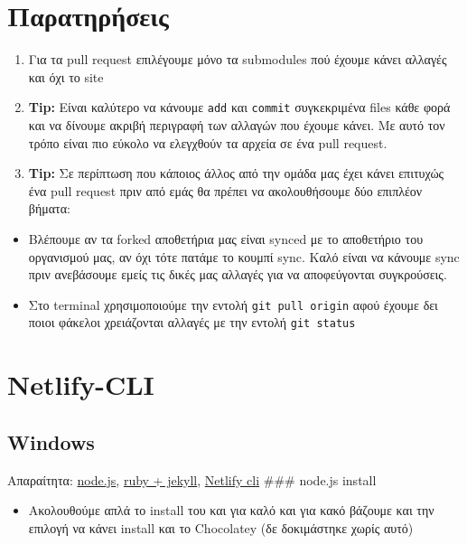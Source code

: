 \documentclass[
]{article}
\begin{document}
\hypertarget{ux3c0ux3b1ux3c1ux3b1ux3c4ux3b7ux3c1ux3aeux3c3ux3b5ux3b9ux3c2}{%
\section{Παρατηρήσεις}\label{ux3c0ux3b1ux3c1ux3b1ux3c4ux3b7ux3c1ux3aeux3c3ux3b5ux3b9ux3c2}}

\begin{enumerate}
\item
  Για τα pull request επιλέγουμε μόνο τα submodules πού έχουμε κάνει
  αλλαγές και όχι το site
\item
  \textbf{Tip:} Είναι καλύτερο να κάνουμε \texttt{add} και
  \texttt{commit} συγκεκριμένα files κάθε φορά και να δίνουμε ακριβή
  περιγραφή των αλλαγών που έχουμε κάνει. Με αυτό τον τρόπο είναι πιο
  εύκολο να ελεγχθούν τα αρχεία σε ένα pull request.
\item
  \textbf{Tip:} Σε περίπτωση που κάποιος άλλος από την ομάδα μας έχει
  κάνει επιτυχώς ένα pull request πριν από εμάς θα πρέπει να
  ακολουθήσουμε δύο επιπλέον βήματα:
\end{enumerate}

\begin{itemize}
\item
  Βλέπουμε αν τα forked αποθετήρια μας είναι synced με το αποθετήριο του
  οργανισμού μας, αν όχι τότε πατάμε το κουμπί sync. Καλό είναι να
  κάνουμε sync πριν ανεβάσουμε εμείς τις δικές μας αλλαγές για να
  αποφεύγονται συγκρούσεις.
\item
  Στο terminal χρησιμοποιούμε την εντολή \texttt{git~pull~origin} αφού
  έχουμε δει ποιοι φάκελοι χρειάζονται αλλαγές με την εντολή
  \texttt{git~status}
\end{itemize}

\hypertarget{netlify-cli}{%
\section{Netlify-CLI}\label{netlify-cli}}

\hypertarget{windows}{%
\subsection{Windows}\label{windows}}

Απαραίτητα: \href{https://nodejs.org/en/download/}{node.js},
\href{https://rubyinstaller.org/downloads/}{ruby + jekyll},
\href{https://cli.netlify.com/}{Netlify cli} \#\#\# node.js install

\begin{itemize}
\item
  Ακολουθούμε απλά το install του και για καλό και για κακό βάζουμε και
  την επιλογή να κάνει install και το Chocolatey (δε δοκιμάστηκε χωρίς
  αυτό)
\end{itemize}
\end{document}
